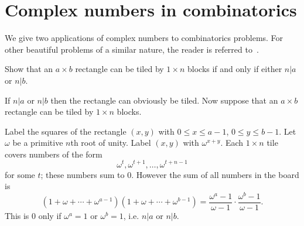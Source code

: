 \section{Complex numbers in combinatorics}
We give two applications of complex numbers to combinatorics problems. For other beautiful problems of a similar nature, the reader is referred to~\cite[\S 8]{PftB}.
\begin{ex}
Show that an $a\times b$ rectangle can be tiled by $1\times n$ blocks if and only if either $n|a$ or $n|b$.
\end{ex}
 If $n|a$ or $n|b$ then the rectangle can obviously be tiled. Now suppose that an $a\times b$ rectangle can be tiled by $1\times n$ blocks.

Label the squares of the rectangle $(x,y)$ with $0\leq x\leq a-1$, $0\leq y\leq b-1$. Let $\omega$ be a primitive $n$th root of unity. Label $(x,y)$ with $\omega^{x+y}$. Each $1\times n$ tile covers numbers of the form
\[
\omega^t,\omega^{t+1},\ldots, \omega^{t+n-1}
\]
for some $t$; these numbers  sum to 0. However the sum of all numbers in the board is 
\[(1+\omega+\cdots +\omega^{a-1})(1+\omega+\cdots+\omega^{b-1})=\frac{\omega^a-1}{\omega-1}\cdot \frac{\omega^b-1}{\omega-1}.\]
This is 0 only if $\omega^a=1$ or $\omega^b=1$, i.e. $n|a$ or $n|b$.

